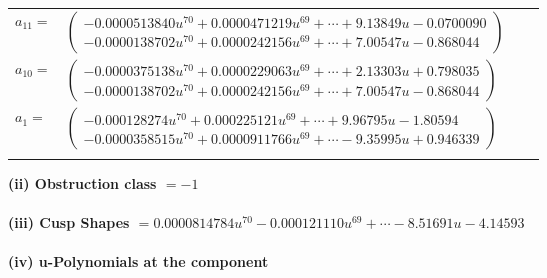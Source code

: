 \documentclass[1p]{elsarticle_modified}
\theoremstyle{definition}
\begin{document}
\begin{tabular}{m{7pt} m{180pt} m{7pt} m{180pt} }
\flushright $a_{11}=$&$\begin{pmatrix}-0.0000513840 u^{70}+0.0000471219 u^{69}+\cdots+9.13849 u-0.0700090\\-0.0000138702 u^{70}+0.0000242156 u^{69}+\cdots+7.00547 u-0.868044\end{pmatrix}$ \\
\flushright $a_{10}=$&$\begin{pmatrix}-0.0000375138 u^{70}+0.0000229063 u^{69}+\cdots+2.13303 u+0.798035\\-0.0000138702 u^{70}+0.0000242156 u^{69}+\cdots+7.00547 u-0.868044\end{pmatrix}$ \\
\flushright $a_{1}=$&$\begin{pmatrix}-0.000128274 u^{70}+0.000225121 u^{69}+\cdots+9.96795 u-1.80594\\-0.0000358515 u^{70}+0.0000911766 u^{69}+\cdots-9.35995 u+0.946339\end{pmatrix}$\\&\end{tabular}
\flushleft \textbf{(ii) Obstruction class $= -1$}\\~\\
\flushleft \textbf{(iii) Cusp Shapes $= 0.0000814784 u^{70}-0.000121110 u^{69}+\cdots-8.51691 u-4.14593$}\\~\\
\newpage\renewcommand{\arraystretch}{1}
\flushleft \textbf{(iv) u-Polynomials at the component}\newline \\
\end{document}
